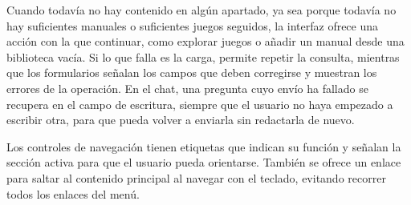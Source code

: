 Cuando todavía no hay contenido en algún apartado, ya sea porque todavía no hay suficientes manuales o suficientes juegos seguidos, la interfaz ofrece una acción con la que
continuar, como explorar juegos o añadir un manual desde una biblioteca
vacía. Si lo que falla es la carga, permite repetir la consulta, mientras
que los formularios señalan los campos que deben corregirse y muestran
los errores de la operación. En el chat, una pregunta cuyo envío ha fallado
se recupera en el campo de escritura, siempre que el usuario no haya
empezado a escribir otra, para que pueda volver a enviarla sin redactarla
de nuevo.

Los controles de navegación tienen etiquetas que indican su función y
señalan la sección activa para que el usuario pueda orientarse. También
se ofrece un enlace para saltar al contenido principal al navegar con el
teclado, evitando recorrer todos los enlaces del menú.
